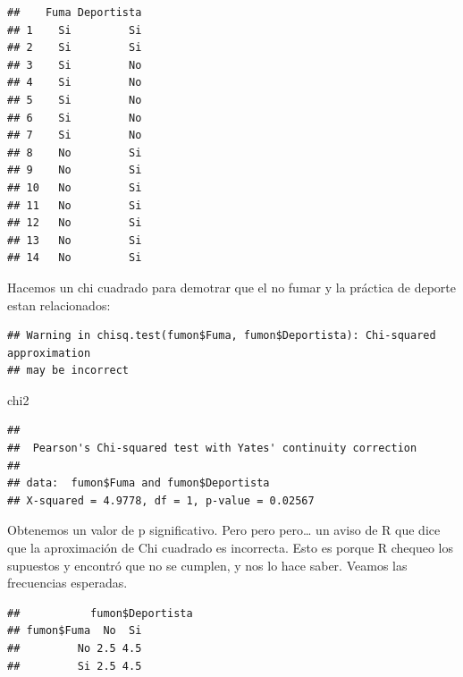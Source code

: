 \documentclass[
]{book}
\newenvironment{Shaded}{\begin{snugshade}}{\end{snugshade}}
\newcommand{\FunctionTok}[1]{\textcolor[rgb]{0.00,0.00,0.00}{#1}}
\newcommand{\NormalTok}[1]{#1}
\newcommand{\OtherTok}[1]{\textcolor[rgb]{0.56,0.35,0.01}{#1}}
\newcommand{\SpecialCharTok}[1]{\textcolor[rgb]{0.00,0.00,0.00}{#1}}
\begin{document}
\begin{verbatim}
##    Fuma Deportista
## 1    Si         Si
## 2    Si         Si
## 3    Si         No
## 4    Si         No
## 5    Si         No
## 6    Si         No
## 7    Si         No
## 8    No         Si
## 9    No         Si
## 10   No         Si
## 11   No         Si
## 12   No         Si
## 13   No         Si
## 14   No         Si
\end{verbatim}

Hacemos un chi cuadrado para demotrar que el no fumar y la práctica de deporte estan relacionados:

\begin{Shaded}
\end{Shaded}

\begin{verbatim}
## Warning in chisq.test(fumon$Fuma, fumon$Deportista): Chi-squared approximation
## may be incorrect
\end{verbatim}

\begin{Shaded}
\begin{Highlighting}[]
\NormalTok{chi2}
\end{Highlighting}
\end{Shaded}

\begin{verbatim}
## 
##  Pearson's Chi-squared test with Yates' continuity correction
## 
## data:  fumon$Fuma and fumon$Deportista
## X-squared = 4.9778, df = 1, p-value = 0.02567
\end{verbatim}

Obtenemos un valor de p significativo. Pero pero pero\ldots{} un aviso de R que dice que la aproximación de Chi cuadrado es incorrecta. Esto es porque R chequeo los supuestos y encontró que no se cumplen, y nos lo hace saber. Veamos las frecuencias esperadas.

\begin{Shaded}
\end{Shaded}

\begin{verbatim}
##           fumon$Deportista
## fumon$Fuma  No  Si
##         No 2.5 4.5
##         Si 2.5 4.5
\end{verbatim}
\end{document}

